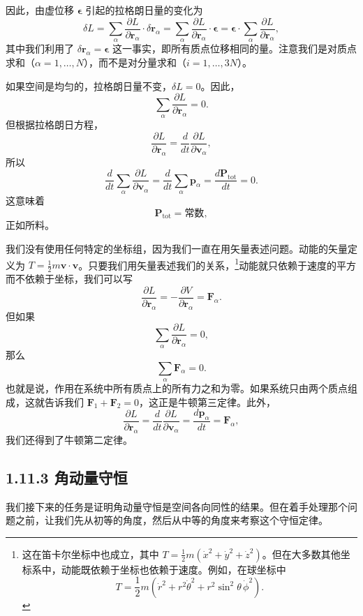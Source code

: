 因此，由虚位移 $\boldsymbol{\epsilon}$ 引起的拉格朗日量的变化为
$$
\delta L = \sum_{\alpha}\frac{\partial L}{\partial \mathbf{r}_\alpha}\cdot\delta\mathbf{r}_\alpha = \sum_{\alpha}\frac{\partial L}{\partial \mathbf{r}_\alpha}\cdot\boldsymbol{\epsilon} = \boldsymbol{\epsilon}\cdot\sum_{\alpha}\frac{\partial L}{\partial \mathbf{r}_\alpha},
$$
其中我们利用了 $\delta\mathbf{r}_\alpha = \boldsymbol{\epsilon}$ 这一事实，即所有质点位移相同的量。注意我们是对质点求和（$\alpha = 1, \ldots, N$），而不是对分量求和（$i = 1, \ldots, 3N$）。

如果空间是均匀的，拉格朗日量不变，$\delta L = 0$。因此，
$$
\sum_{\alpha}\frac{\partial L}{\partial \mathbf{r}_\alpha} = 0.
$$
但根据拉格朗日方程，
$$
\frac{\partial L}{\partial \mathbf{r}_\alpha} = \frac{d}{dt}\frac{\partial L}{\partial \mathbf{v}_\alpha},
$$
所以
$$
\frac{d}{dt}\sum_{\alpha}\frac{\partial L}{\partial \mathbf{v}_\alpha} = \frac{d}{dt}\sum_{\alpha}\mathbf{p}_\alpha = \frac{d\mathbf{P}_{\mathrm{tot}}}{dt} = 0.
$$
这意味着
$$
\mathbf{P}_{\mathrm{tot}} = \text{常数},
$$
正如所料。

我们没有使用任何特定的坐标组，因为我们一直在用矢量表述问题。动能的矢量定义为 $T = \frac{1}{2}m\mathbf{v}\cdot\mathbf{v}$。只要我们用矢量表述我们的关系，\footnote{这在笛卡尔坐标中也成立，其中 $T = \frac{1}{2}m\left(\dot{x}^2 + \dot{y}^2 + \dot{z}^2\right)$。但在大多数其他坐标系中，动能既依赖于坐标也依赖于速度。例如，在球坐标中
$$
T = \frac{1}{2}m(\dot{r}^2 + r^2\dot{\theta}^2 + r^2\sin^2\theta\,\dot{\phi}^2).
$$}动能就只依赖于速度的平方而不依赖于坐标，我们可以写
$$
\frac{\partial L}{\partial \mathbf{r}_\alpha} = -\frac{\partial V}{\partial \mathbf{r}_\alpha} = \mathbf{F}_\alpha.
$$
但如果
$$
\sum_{\alpha}\frac{\partial L}{\partial \mathbf{r}_\alpha} = 0,
$$
那么
$$
\sum_{\alpha}\mathbf{F}_\alpha = 0.
$$
也就是说，作用在系统中所有质点上的所有力之和为零。如果系统只由两个质点组成，这就告诉我们 $\mathbf{F}_1 + \mathbf{F}_2 = 0$，这正是牛顿第三定律。此外，
$$
\frac{\partial L}{\partial \mathbf{r}_\alpha} = \frac{d}{dt}\frac{\partial L}{\partial \mathbf{v}_\alpha} = \frac{d\mathbf{p}_\alpha}{dt} = \mathbf{F}_\alpha,
$$
我们还得到了牛顿第二定律。

\subsection*{1.11.3  角动量守恒}

我们接下来的任务是证明角动量守恒是空间各向同性的结果。但在着手处理那个问题之前，让我们先从初等的角度，然后从中等的角度来考察这个守恒定律。

